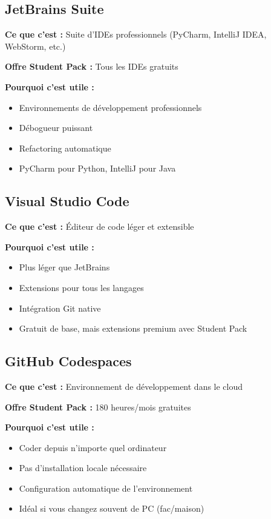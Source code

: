 \documentclass[11pt,a4paper]{article}
\begin{document}
\subsection{JetBrains Suite}

\textbf{Ce que c'est :} Suite d'IDEs professionnels (PyCharm, IntelliJ IDEA, WebStorm, etc.)

\textbf{Offre Student Pack :} Tous les IDEs gratuits

\textbf{Pourquoi c'est utile :}
\begin{itemize}
    \item Environnements de développement professionnels
    \item Débogueur puissant
    \item Refactoring automatique
    \item PyCharm pour Python, IntelliJ pour Java
\end{itemize}

\subsection{Visual Studio Code}

\textbf{Ce que c'est :} Éditeur de code léger et extensible

\textbf{Pourquoi c'est utile :}
\begin{itemize}
    \item Plus léger que JetBrains
    \item Extensions pour tous les langages
    \item Intégration Git native
    \item Gratuit de base, mais extensions premium avec Student Pack
\end{itemize}

\subsection{GitHub Codespaces}

\textbf{Ce que c'est :} Environnement de développement dans le cloud

\textbf{Offre Student Pack :} 180 heures/mois gratuites

\textbf{Pourquoi c'est utile :}
\begin{itemize}
    \item Coder depuis n'importe quel ordinateur
    \item Pas d'installation locale nécessaire
    \item Configuration automatique de l'environnement
    \item Idéal si vous changez souvent de PC (fac/maison)
\end{itemize}
\end{document}
